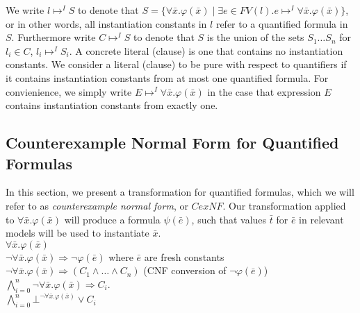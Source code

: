 \documentclass{llncs}
\begin{document}

We write $l \mapsto^I S$ to denote that $S = \{ \forall \bar{x}. \varphi( \bar{x} ) \mid \exists e \in FV( l ). e \mapsto^I \forall \bar{x}. \varphi( \bar{x} ) \}$, or in other words, all instantiation constants in $l$ refer to a quantified formula in $S$.
Furthermore write $C \mapsto^I S$ to denote that $S$ is the union of the sets $S_1 \ldots S_n$ for $l_i \in C$, $l_i \mapsto^I S_i$.
A concrete literal (clause) is one that contains no instantiation constants.
We consider a literal (clause) to be pure with respect to quantifiers if it contains instantiation constants from at most one quantified formula.
For convienience, we simply write $E \mapsto^I \forall \bar{x}. \varphi( \bar{x} )$ in the case that expression $E$ contains instantiation constants from exactly one.

\subsection{Counterexample Normal Form for Quantified Formulas}
\label{sec:CENF}

In this section, we present a transformation for quantified formulas, which we will refer to as \emph{counterexample normal form}, or $CexNF$.
Our transformation applied to $\forall \bar{x}. \varphi( \bar{ x } )$ will produce a formula $\psi( \bar{e} )$, such that values $\bar{t}$ for $\bar{e}$ in relevant models will be used to instantiate $\bar{x}$. \\

\noindent $\forall \bar{x}. \varphi( \bar{ x } )$ \\
$\neg \forall \bar{x}. \varphi( \bar{ x } ) \Rightarrow \neg \varphi( \bar{e} )$  where $\bar{e}$ are fresh constants \\
$\neg \forall \bar{x}. \varphi( \bar{ x } ) \Rightarrow (C_1 \wedge \ldots \wedge C_n )$ (CNF conversion of $\neg \varphi( \bar{ e } )$) \\
$\displaystyle\bigwedge\limits_{i=0}^n \neg \forall \bar{x}. \varphi( \bar{ x } ) \Rightarrow C_i$. \\
$\displaystyle\bigwedge\limits_{i=0}^n \bot^{\neg \forall \bar{x}. \varphi( \bar{ x } )} \vee C_i$ \\
\end{document}
